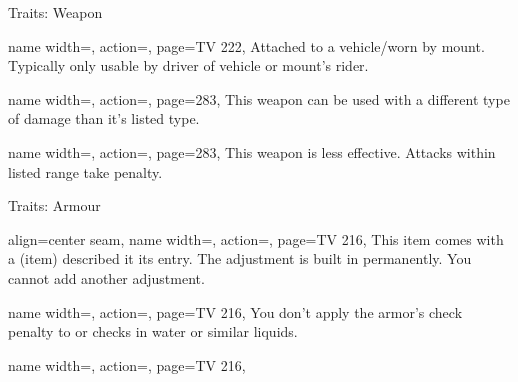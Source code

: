 \begin{PageBack}
\begin{Tables}{\backTableHeight}
\begin{Table}{Traits: Weapon}
            \breakLine
            \begin{entry}{}{%
                name width=\conditionLength,%
                action=\Vehicular,
                page=TV 222,
            }
                Attached to a vehicle/worn by mount. Typically only usable by driver of vehicle or mount's rider. \hfill
            \end{entry}
            \begin{entry}{}{%
                name width=\conditionLength,%
                action=\Versatile,
                page=283,
            }
                This weapon can be used with a different type of damage than it's listed type.
            \end{entry}
            \begin{entry}{}{%
                name width=\conditionLength,%
                action=\Volley,
                page=283,
            }
                This weapon is less effective. Attacks within listed range take  penalty.
            \end{entry}
        \end{Table}
    \end{Tables}%
    \begin{Tables}{\backTableHeight}%
        \renewcommand{\TableSpace}{\\\vspace{2mm}\\}%
        \begin{Table}{Traits: Armour}
            \begin{entry}{}{%
                align=center seam,
                name width=\conditionLength,%
                action=\Adjusted,
                page=TV 216,
            }
                This item comes with a  (item) described it its entry.
                The adjustment is built in permanently.
                You cannot add another adjustment.
            \end{entry}
            \begin{entry}{}{%
                name width=\conditionLength,%
                action=\Aquadynamic,
                page=TV 216,
            }
                You don't apply the armor's check penalty to \AcrobaticsT or \AthleticsT checks in water or similar liquids.
            \end{entry}
            \begin{entry}{}{%
                name width=\conditionLength,%
                action=\Barding,
                page=TV 216,
            }

\end{entry}
\end{Table}
\end{Tables}
\end{PageBack}
